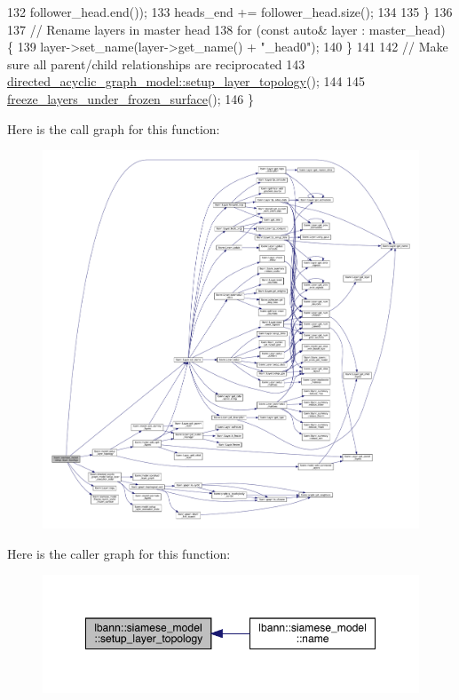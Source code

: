 \begin{DoxyCode}
132                     follower\_head.end());
133     heads\_end += follower\_head.size();
134 
135   \}
136 
137   \textcolor{comment}{// Rename layers in master head}
138   \textcolor{keywordflow}{for} (\textcolor{keyword}{const} \textcolor{keyword}{auto}& layer : master\_head) \{
139     layer->set\_name(layer->get\_name() + \textcolor{stringliteral}{"\_head0"});
140   \}
141 
142   \textcolor{comment}{// Make sure all parent/child relationships are reciprocated}
143   \hyperlink{classlbann_1_1model_a7b3e2a643c658dcaa7478d2568f29784}{directed\_acyclic\_graph\_model::setup\_layer\_topology}();
144 
145   \hyperlink{classlbann_1_1siamese__model_a3960a32fd45059516f3acb41549e1e92}{freeze\_layers\_under\_frozen\_surface}();
146 \}
\end{DoxyCode}
Here is the call graph for this function\+:\nopagebreak
\begin{figure}[H]
\begin{center}
\leavevmode
\includegraphics[width=350pt]{classlbann_1_1siamese__model_a7ff41cffb060500605124959f1a2a6cf_cgraph}
\end{center}
\end{figure}
Here is the caller graph for this function\+:\nopagebreak
\begin{figure}[H]
\begin{center}
\leavevmode
\includegraphics[width=349pt]{classlbann_1_1siamese__model_a7ff41cffb060500605124959f1a2a6cf_icgraph}
\end{center}
\end{figure}
